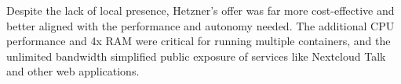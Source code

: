 Despite the lack of local presence, Hetzner's offer was far more cost-effective and better aligned with the performance and autonomy needed. The additional CPU performance and 4x RAM were critical for running multiple containers, and the unlimited bandwidth simplified public exposure of services like Nextcloud Talk and other web applications.
